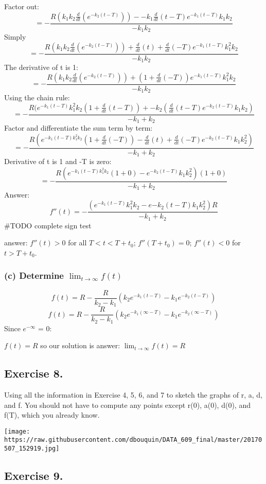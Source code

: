 \documentclass[]{article}
\begin{document}
Factor out:
\[=-\frac{R(k_1 k_2 \frac{d}{dt}(e^{-k_2(t-T)}))--k_1\frac{d}{dt}(t-T)e^{-k_1(t-T)}k_1 k_2}{-k_1 k_2}\]
Simply
\[=-\frac{R(k_1 k_2 \frac{d}{dt}(e^{-k_2(t-T)}))+\frac{d}{dt}(t)+\frac{d}{dt}(-T)e^{-k_1(t-T)}k_1^2 k_2}{-k_1 k_2}\]
The derivative of t is 1:
\[=-\frac{R(k_1 k_2 \frac{d}{dt}(e^{-k_2(t-T)}))+(1+\frac{d}{dt}(-T))e^{-k_1(t-T)}k_1^2 k_2}{-k_1 k_2}\]
Using the chain rule:
\[=-\frac{R(e^{-k_1(t-T)}k_1^2k_2(1+\frac{d}{dt}(t-T))+-k_2(\frac{d}{dt}(t-T)e^{-k_2(t-T)}k_1 k_2)}{-k_1 + k_2}\]
Factor and differentiate the sum term by term:
\[=-\frac{R(e^{-k_1(t-T)k_1^2k_2}(1+\frac{d}{dt}(-T))- \frac{d}{dt}(t)+\frac{d}{dt}(-T)e^{-k_2(t-T)}k_1 k_2^2)}{-k_1 + k_2}\]
Derivative of t is 1 and -T is zero:
\[=-\frac{R(e^{-k_1(t-T)k_1^2k_2}(1+0)-e^{-k_2(t-T)}k_1 k_2^2)(1+0)}{-k_1 + k_2}\]
Answer:
\[f''(t) =-\frac{(e^{-k_1 (t-T)}k_1^2 k_2 -e{-k_2(t-T)}k_1 k_2^2)R}{-k_1 + k_2}\]
\#TODO complete sign test

answer: \(f''(t) > 0\) for all \(T < t < T + t_0\); \(f''(T + t_0) =0\);
\(f''(t) < 0\) for \(t > T + t_0\).

\subsubsection{\texorpdfstring{(c) Determine
\(\lim_{t\to\infty}f(t)\)}{(c) Determine \textbackslash{}lim\_\{t\textbackslash{}to\textbackslash{}infty\}f(t)}}\label{c-determine-lim_ttoinftyft}

\[f(t) = R - \frac{R}{k_2 - k_1}(k_2 e^{-k_1(t-T)}-k_1 e^{-k_2(t-T)})\]
\[f(t) = R - \frac{R}{k_2 - k_1}(k_2 e^{-k_1(\infty-T)}-k_1 e^{-k_2(\infty-T)})\]
Since \(e^{-\infty}\) = 0:

\(f(t) = R\) so our solution is answer: \(\lim_{t\to\infty}f(t) = R\)

\subsection{Exercise 8.}\label{exercise-8.}

Using all the information in Exercise 4, 5, 6, and 7 to sketch the
graphs of r, a, d, and f. You should not have to compute any points
except r(0), a(0), d(0), and f(T), which you already know.

\texttt{[image: https://raw.githubusercontent.com/dbouquin/DATA\_609\_final/master/20170507\_152919.jpg]}
\newpage

\subsection{Exercise 9.}\label{exercise-9.}
\end{document}
